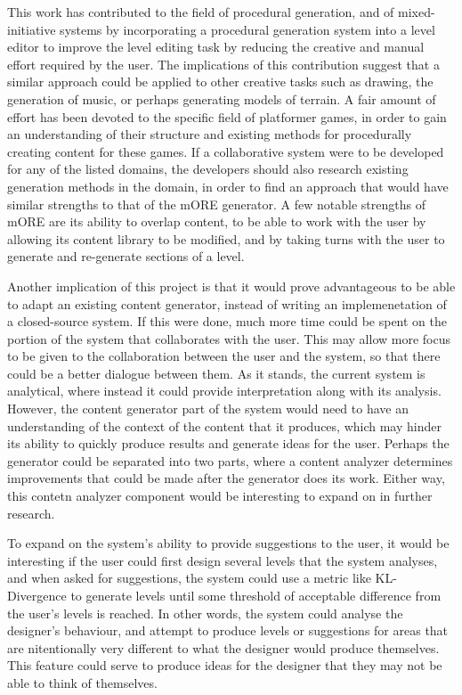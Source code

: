 This work has contributed to the field of procedural generation, and of mixed-initiative
systems by incorporating a procedural generation system into a level editor to improve the
level editing task by reducing the creative and manual effort required by the user. The
implications of this contribution suggest that a similar approach could be applied to other
creative tasks such as drawing, the generation of music, or perhaps generating models of
terrain. A fair amount of effort has been devoted to the specific field of platformer games,
in order to gain an understanding of their structure and existing methods for procedurally
creating content for these games. If a collaborative system were to be developed for any of
the listed domains, the developers should also research existing generation methods in the
domain, in order to find an approach that would have similar strengths to that of the mORE
generator. A few notable strengths of mORE are its ability to overlap content, to be able to
work with the user by allowing its content library to be modified, and by taking turns with 
the user to generate and re-generate sections of a level.

Another implication of this project is that it would prove advantageous to be able to adapt
an existing content generator, instead of writing an implemenetation of a closed-source 
system. If this were done, much more time could be spent on the portion of the system that
collaborates with the user. This may allow more focus to be given to the collaboration 
between the user and the system, so that there could be a better dialogue between them. As
it stands, the current system is analytical, where instead it could provide interpretation
along with its analysis. However, the content generator part of the system would need to
have an understanding of the context of the content that it produces, which may hinder its
ability to quickly produce results and generate ideas for the user. Perhaps the generator
could be separated into two parts, where a content analyzer determines improvements that
could be made after the generator does its work. Either way, this contetn analyzer component
would be interesting to expand on in further research.

To expand on the system's ability to provide suggestions to the user, it would be
interesting if the user could first design several levels that the system analyses, and
when asked for suggestions, the system could use a metric like KL-Divergence to generate
levels until some threshold of acceptable difference from the user's levels is reached.
In other words, the system could analyse the designer's behaviour, and attempt to produce
levels or suggestions for areas that are nitentionally very different to what the designer
would produce themselves. This feature could serve to produce ideas for the designer that
they may not be able to think of themselves.

